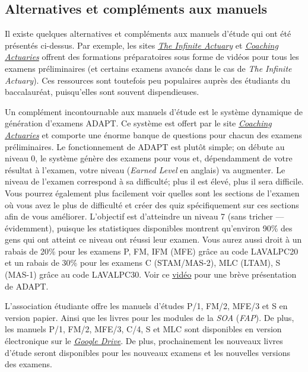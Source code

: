 \newpage

\subsection*{Alternatives et compléments aux manuels}
\label{subsec:alternatives}
Il existe quelques alternatives et compléments aux manuels d'étude qui ont été présentés ci-dessus. Par exemple, les sites \href{http://www.theinfiniteactuary.com/}{\emph{The Infinite Actuary}} et \href{https://www.coachingactuaries.com/}{\emph{Coaching Actuaries}} offrent des formations préparatoires sous forme de vidéos pour tous les examens préliminaires (et certains examens avancés dans le cas de \emph{The Infinite Actuary}). Ces ressources sont toutefois peu populaires auprès des étudiants du baccalauréat, puisqu'elles sont souvent dispendieuses.\vspace{\baselineskip}

Un complément incontournable aux manuels d'étude est le système dynamique de génération d'examens ADAPT. Ce système est offert par le site \href{https://www.coachingactuaries.com/}{\emph{Coaching Actuaries}} et comporte une énorme banque de questions pour chacun des examens préliminaires. Le fonctionnement de ADAPT est plutôt simple; on débute au niveau 0, le système génère des examens pour vous et, dépendamment de votre résultat à l'examen, votre niveau (\emph{Earned Level} en anglais) va augmenter. Le niveau de l'examen correspond à sa difficulté; plus il est élevé, plus il sera difficile. Vous pourrez également plus facilement voir quelles sont les sections de l'examen où vous avez le plus de difficulté et créer des quiz spécifiquement sur ces sections afin de vous améliorer. L'objectif est d'atteindre un niveau 7 (sans tricher --- évidemment), puisque les statistiques disponibles montrent qu'environ 90\% des gens qui ont atteint ce niveau ont réussi leur examen. Vous aurez aussi droit à un rabais de 20\% pour les examens P, FM, IFM (MFE) grâce au code LAVALPC20 et un rabais de 30\% pour les examens C (STAM/MAS-2), MLC (LTAM), S (MAS-1) grâce au code LAVALPC30. Voir ce \href{https://www.youtube.com/watch?v=ZBxLa2J5jhs}{vidéo} pour une brève présentation de ADAPT.

L'association étudiante offre les manuels d'études P/1, FM/2, MFE/3 et S en version papier. Ainsi que les livres pour les modules de la \textit{SOA} (\textit{FAP}). De plus, les manuels P/1, FM/2, MFE/3, C/4, S et MLC sont disponibles en version électronique sur le \href{https://drive.google.com/open?id=0B6kXivc6X9LISE1ydE41UnY3UDQ}{\textit{Google Drive}}. De plus, prochainement les nouveaux livres d'étude seront disponibles pour les nouveaux examens et les nouvelles versions des examens.
\newpage
